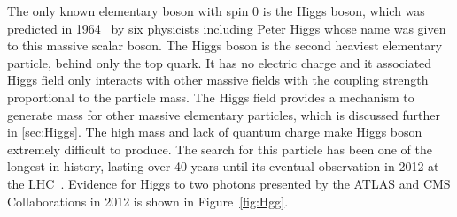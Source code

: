 The only known elementary boson with spin 0 is the Higgs boson, which was predicted in 1964~\cite{PhysRevLett.13.321,PhysRevLett.13.508,PhysRevLett.13.585} by six physicists including Peter Higgs whose name was given to this massive scalar boson. The Higgs boson is the second heaviest elementary particle, behind only the top quark. It has no electric charge and it associated Higgs field only interacts with other massive fields with the coupling strength proportional to the particle mass. The Higgs field provides a mechanism to generate mass for other massive elementary particles, which is discussed further in \autoref{sec:Higgs}. The high mass and lack of quantum charge make Higgs boson extremely difficult to produce. The search for this particle has been one of the longest in history, lasting over 40 years until its eventual observation in 2012 at the LHC~\cite{ATLAS:2012yve,CMS:2012qbp}. Evidence for Higgs to two photons presented by the \ac{ATLAS} and \ac{CMS} Collaborations in 2012 is shown in Figure~\ref{fig:Hgg}.

